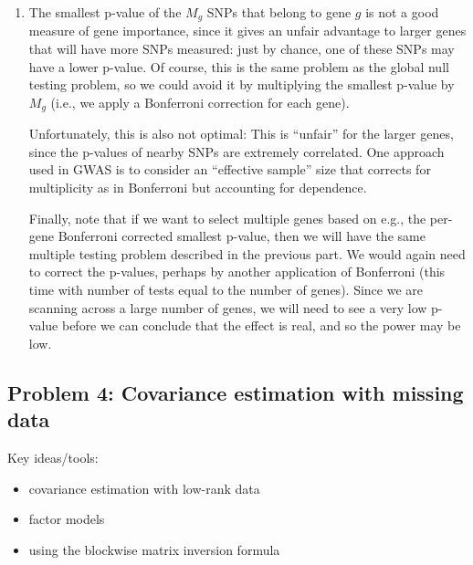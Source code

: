 \begin{enumerate}[label=(\alph*)]
\item 
 The smallest p-value of the $M_g$ SNPs that belong to gene $g$ is not a good measure of gene importance, since it gives an unfair advantage to larger genes that will have more SNPs measured: just by chance, one of these SNPs may have a lower p-value. Of course, this is the same problem as the global null testing problem, so we could avoid it by multiplying the smallest p-value by $M_g$ (i.e., we apply a Bonferroni correction for each gene).

 Unfortunately, this is also not optimal: This is ``unfair'' for the larger genes, since the p-values of nearby SNPs are extremely correlated. One approach used in GWAS is to consider an ``effective sample'' size that corrects for multiplicity as in Bonferroni but accounting for dependence.


Finally, note that if we want to select multiple genes based on e.g., the per-gene Bonferroni corrected smallest p-value, then we will have the same multiple testing problem described in the previous part. We would again need to correct the p-values, perhaps by another application of Bonferroni (this time with number of tests equal to the number of genes). Since we are scanning across a large number of genes, we will need to see a very low p-value before we can conclude that the effect is real, and so the power may be low. 


\end{enumerate}

\subsection*{Problem 4: Covariance estimation with missing data}
Key ideas/tools:
\begin{itemize}
  \item covariance estimation with low-rank data
  \item factor models
  \item using the blockwise matrix inversion formula
\end{itemize}

